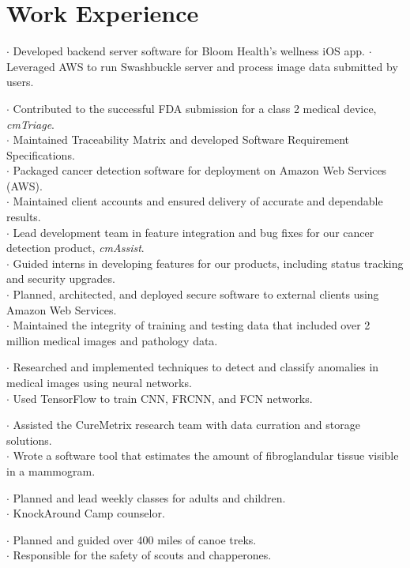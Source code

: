 \section{Work Experience}

$\cdot$ Developed backend server software for Bloom Health's wellness iOS app.
$\cdot$ Leveraged AWS to run Swashbuckle server and process image data submitted by users.

$\cdot$ Contributed to the successful FDA submission for a class 2 medical device, {\it cmTriage}.\\
$\cdot$ Maintained Traceability Matrix and developed Software Requirement Specifications.\\
$\cdot$ Packaged cancer detection software for deployment on Amazon Web Services (AWS).\\
$\cdot$ Maintained client accounts and ensured delivery of accurate and dependable results.\\
$\cdot$ Lead development team in feature integration and bug fixes for our cancer detection product, {\it cmAssist}.\\
$\cdot$ Guided interns in developing features for our products, including status tracking and security upgrades.\\
$\cdot$ Planned, architected, and deployed secure software to external clients using Amazon Web Services.\\
$\cdot$ Maintained the integrity of training and testing data that included over 2 million medical images and pathology data.

$\cdot$ Researched and implemented techniques to detect and classify anomalies in medical images using neural networks.\\
$\cdot$ Used TensorFlow to train CNN, FRCNN, and FCN networks.

$\cdot$ Assisted the CureMetrix research team with data curration and storage solutions.\\
$\cdot$ Wrote a software tool that estimates the amount of fibroglandular tissue visible in a mammogram.

$\cdot$ Planned and lead weekly classes for adults and children.\\
$\cdot$ KnockAround Camp counselor.

$\cdot$ Planned and guided over 400 miles of canoe treks.\\
$\cdot$ Responsible for the safety of scouts and chapperones.
